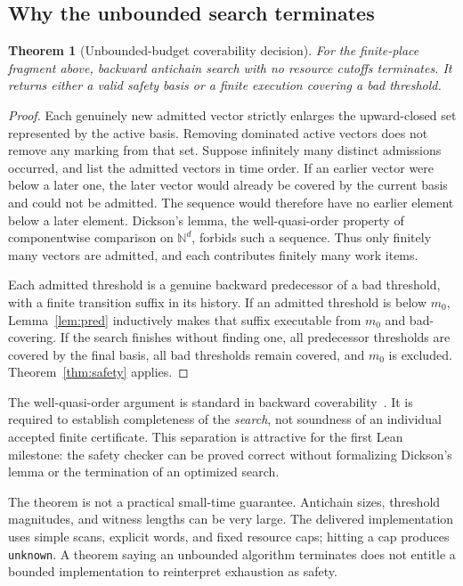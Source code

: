 \documentclass[11pt,a4paper]{article}
\newtheorem{theorem}{Theorem}[section]
\theoremstyle{definition}\newtheorem{definition}[theorem]{Definition}
\theoremstyle{remark}\newtheorem{remark}[theorem]{Remark}
\newcommand{\N}{\mathbb N}\newcommand{\Q}{\mathbb Q}\newcommand{\R}{\mathbb R}
\newcommand{\code}[1]{\nolinkurl{#1}}
\begin{document}
\subsection{Why the unbounded search terminates}
\begin{theorem}[Unbounded-budget coverability decision]
\label{thm:petri-complete}
For the finite-place fragment above, backward antichain search with no resource cutoffs terminates. It returns either a valid safety basis or a finite execution covering a bad threshold.
\end{theorem}
\begin{proof}
Each genuinely new admitted vector strictly enlarges the upward-closed set represented by the active basis. Removing dominated active vectors does not remove any marking from that set. Suppose infinitely many distinct admissions occurred, and list the admitted vectors in time order. If an earlier vector were below a later one, the later vector would already be covered by the current basis and could not be admitted. The sequence would therefore have no earlier element below a later element. Dickson's lemma, the well-quasi-order property of componentwise comparison on $\N^d$, forbids such a sequence. Thus only finitely many vectors are admitted, and each contributes finitely many work items.

Each admitted threshold is a genuine backward predecessor of a bad threshold, with a finite transition suffix in its history. If an admitted threshold is below $m_0$, Lemma~\ref{lem:pred} inductively makes that suffix executable from $m_0$ and bad-covering. If the search finishes without finding one, all predecessor thresholds are covered by the final basis, all bad thresholds remain covered, and $m_0$ is excluded. Theorem~\ref{thm:safety} applies.
\end{proof}

The well-quasi-order argument is standard in backward coverability~\cite{finkel-schnoebelen}. It is required to establish completeness of the \emph{search}, not soundness of an individual accepted finite certificate. This separation is attractive for the first Lean milestone: the safety checker can be proved correct without formalizing Dickson's lemma or the termination of an optimized search.

The theorem is not a practical small-time guarantee. Antichain sizes, threshold magnitudes, and witness lengths can be very large. The delivered implementation uses simple scans, explicit words, and fixed resource caps; hitting a cap produces \code{unknown}. A theorem saying an unbounded algorithm terminates does not entitle a bounded implementation to reinterpret exhaustion as safety.
\end{document}
